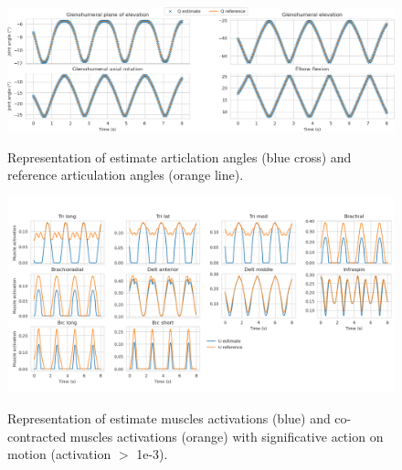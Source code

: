 \begin{figure}[t!]
\centering
\includegraphics[width=\textwidth]{figures/Articular_angle_MHE.png}\\
\caption{Representation of estimate articlation angles (blue cross) and reference articulation angles (orange line).}
\label{fig:angulare_angle_MHE}
\end{figure}
\begin{figure}[t!]
\centering
\includegraphics[width=\textwidth]{figures/Muscles_excitations_MHE.png}\\
\caption{Representation of estimate muscles activations (blue) and co-contracted muscles activations (orange) with significative action on motion (activation $>$ 1e-3).}
\label{fig:muscles_excitations_MHE}
\end{figure}
